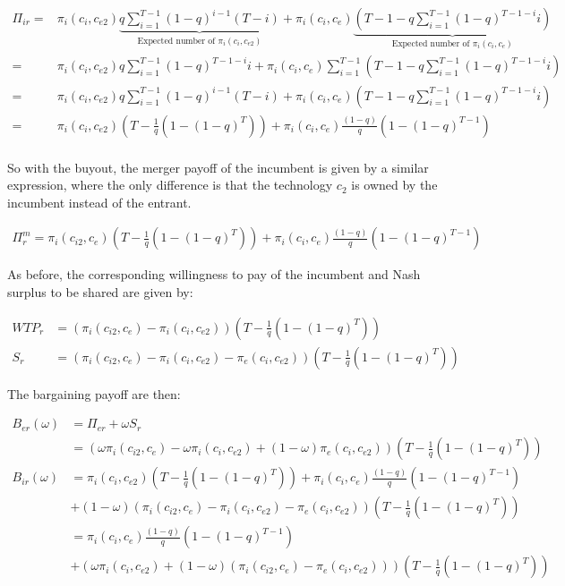\begin{align*}
\Pi_{ir} =& \pi_{i}(c_i,c_{e2}) \underbrace{q \sum_{i=1}^{T-1} (1-q)^{i-1} (T-i)}_{\text{Expected number of } \pi_{i}(c_i,c_{e2})}+ \pi_i(c_i,c_e) \underbrace{ (T-1-q \sum_{i=1}^{T-1} (1-q)^{T-1-i} i)}_{\text{Expected number of } \pi_{i}(c_i,c_{e})}
\\
=& \pi_{i}(c_i,c_{e2}) q \sum_{i=1}^{T-1} (1-q)^{T-1-i} i + \pi_i(c_i,c_e)  \sum_{i=1}^{T-1} (T-1-q \sum_{i=1}^{T-1} (1-q)^{T-1-i} i)
\\ =& \pi_{i}(c_i,c_{e2})q \sum_{i=1}^{T-1} (1-q)^{i-1} (T-i)+ \pi_i(c_i,c_e) (T-1-q \sum_{i=1}^{T-1} (1-q)^{T-1-i} i)
\\ =&\pi_{i}(c_i,c_{e2}) \left( T - \frac{1}{q} \left( 1-(1-q)^{T} \right) \right)
+ \pi_i(c_i,c_e) \frac{(1-q)}{q} \left( 1-(1-q)^{T-1} \right) \\
\end{align*}

So with the buyout, the merger payoff of the incumbent is given by a similar expression, where the only difference is that the technology $c_2$ is owned by the incumbent instead of the entrant. 

\begin{align*}
\Pi^m_r = \pi_{i}(c_{i2},c_{e}) \left( T - \frac{1}{q} \left( 1-(1-q)^{T} \right) \right)
+\pi_i(c_i,c_e) \frac{(1-q)}{q} \left( 1-(1-q)^{T-1} \right)
\end{align*}

As before, the corresponding willingness to pay of the incumbent and Nash surplus to be shared are given by: 

\begin{align*}
WTP_r &= (\pi_{i}(c_{i2},c_{e})-\pi_{i}(c_{i},c_{e2})) \left( T- \frac{1}{q} \left( 1-(1-q)^{T} \right) \right) \\
S_r &= (\pi_{i}(c_{i2},c_{e})-\pi_{i}(c_{i},c_{e2})-\pi_{e}(c_{i},c_{e2})) \left( T - \frac{1}{q} \left( 1-(1-q)^{T} \right) \right)
\end{align*}

The bargaining payoff are then:

\begin{align*}
B_{er}(\omega) &= \Pi_{er}+\omega S_r \\
&= \left(\omega\pi_{i}(c_{i2},c_{e})-\omega \pi_{i}(c_{i},c_{e2})+(1-\omega)\pi_{e}(c_{i},c_{e2}) \right) \left( T - \frac{1}{q} \left( 1-(1-q)^{T} \right) \right) \\
B_{ir}(\omega) &=\pi_{i}(c_i,c_{e2}) \left( T - \frac{1}{q} \left( 1-(1-q)^{T} \right) \right)
+\pi_i(c_i,c_e) \frac{(1-q)}{q} \left( 1-(1-q)^{T-1} \right)
\\ &+(1-\omega)(\pi_{i}(c_{i2},c_{e})-\pi_{i}(c_{i},c_{e2})-\pi_{e}(c_{i},c_{e2})) \left( T- \frac{1}{q} \left( 1-(1-q)^{T} \right) \right) \\
&=\pi_i(c_i,c_e) \frac{(1-q)}{q} \left( 1-(1-q)^{T-1} \right)
\\ &+(\omega \pi_i(c_i,c_{e2})+(1-\omega)(\pi_{i}(c_{i2},c_{e})-\pi_{e}(c_{i},c_{e2}))) \left( T - \frac{1}{q} \left( 1-(1-q)^{T} \right) \right)
\end{align*}

